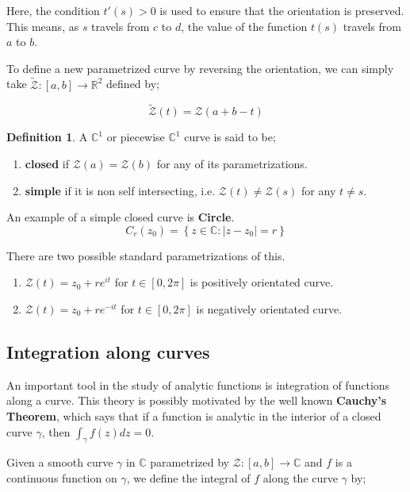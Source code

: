 \documentclass[12pt]{article}
\newcommand{\R}{\mathbb{R}}
\newcommand{\C}{\mathbb{C}}
\newcommand{\zcal}{\mathcal{Z}}
\theoremstyle{definition}
\newtheorem{defn}{Definition}
\newenvironment{definition}{
\begin{tcolorbox}[colback=green!5!white,colframe=green!75!black, parbox = false]\begin{defn} }{\end{defn}\end{tcolorbox} }
\newenvironment{example}{
\begin{tcolorbox}[colback=blue!5!white,colframe=blue!75!black, title = Example, parbox = false] }{\end{tcolorbox} }
\begin{document}
Here, the condition $t'(s) > 0$ is used to ensure that the orientation is preserved. This means, as $s$ travels from $c$ to $d$, the value of the function $t(s)$ travels from $a$ to $b$. 

To define a new parametrized curve by reversing the orientation, we can simply take $\widetilde{\zcal} : [a, b] \rightarrow \R^2$ defined by;

$$\widetilde{\zcal}(t) = \zcal(a + b - t)$$

\begin{definition}
    A $\C^1$ or piecewise $\C^1$ curve is said to be;
    \begin{enumerate}
        \item \textbf{closed} if $\zcal(a) = \zcal(b)$ for any of its parametrizations.
        \item \textbf{simple} if it is non self intersecting, i.e. $\zcal(t) \neq \zcal(s)$ for any $t \neq s$.
    \end{enumerate}
\end{definition}

\begin{example}
    An example of a simple closed curve is \textbf{Circle}. 
    $$C_r(z_0) = \left\{ z \in \C : \vert z - z_0 \vert = r \right\}$$

    There are two possible standard parametrizations of this.
    \begin{enumerate}
        \item $\zcal(t) = z_0 + r e^{it}$ for $t \in [0, 2\pi]$ is positively orientated curve.
        \item $\zcal(t) = z_0 + r e^{-it}$ for $t \in [0, 2\pi]$ is negatively orientated curve.
    \end{enumerate}
\end{example}

\subsection{Integration along curves}

An important tool in the study of analytic functions is integration of functions along a curve. This theory is possibly motivated by the well known \textbf{Cauchy's Theorem}, which says that if a function is analytic in the interior of a closed curve $\gamma$, then $\int_{\gamma} f(z) dz = 0$.

Given a smooth curve $\gamma$ in $\C$ parametrized by $\zcal : [a, b] \rightarrow \C$ and $f$ is a continuous function on $\gamma$, we define the integral of $f$ along the curve $\gamma$ by;
\end{document}
